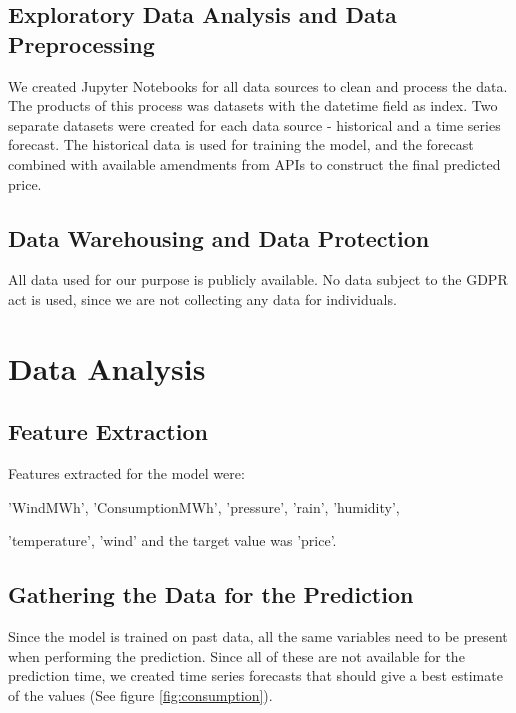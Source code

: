 \documentclass{article}
\begin{document}
\subsection{Exploratory Data Analysis and Data Preprocessing}
\label{subsection:eda}

We created Jupyter Notebooks for all data sources to clean and process the data.
The products of this process was datasets with the datetime field as index.
Two separate datasets were created for each data source - historical and a time series forecast.
The historical data is used for training the model, and the forecast combined with available amendments from APIs to construct the final predicted price.

\subsection{Data Warehousing and Data Protection}
\label{subsection:wareousing}

All data used for our purpose is publicly available. No data subject to the GDPR act is used, since we are not collecting any data for individuals.

\section{Data Analysis}
\label{section:analysis}

\subsection{Feature Extraction}
\label{subsection:extraction}

Features extracted for the model were:

'WindMWh', 'ConsumptionMWh', 'pressure', 'rain', 'humidity',

'temperature', 'wind' and the target value was 'price'.


\subsection{Gathering the Data for the Prediction}
\label{subsection:datafilling}

Since the model is trained on past data, all the same variables need to be present when performing the prediction. Since all of these are not available for the prediction time, we created time series forecasts that should give a best estimate of the values (See figure \ref{fig:consumption}).
\end{document}

